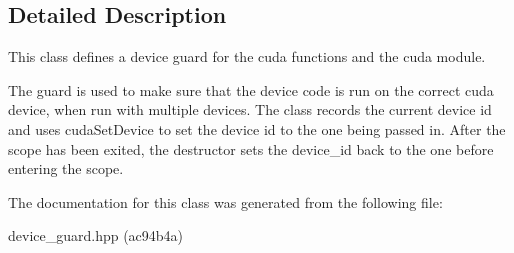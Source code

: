 \subsection{Detailed Description}
This class defines a device guard for the cuda functions and the cuda module. 

The guard is used to make sure that the device code is run on the correct cuda device, when run with multiple devices. The class records the current device id and uses {\ttfamily cuda\+Set\+Device} to set the device id to the one being passed in. After the scope has been exited, the destructor sets the device\+\_\+id back to the one before entering the scope. 

The documentation for this class was generated from the following file\+:\begin{DoxyCompactItemize}
\item 
device\+\_\+guard.\+hpp (ac94b4a)\end{DoxyCompactItemize}
